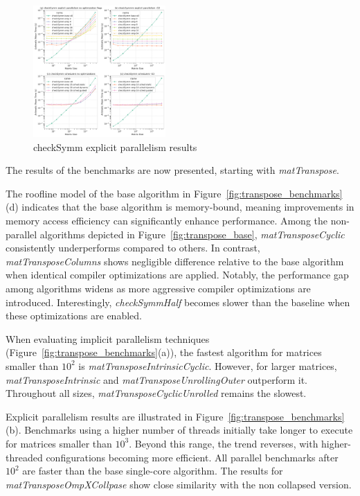 \documentclass[conference]{IEEEtran}
\begin{document}
\begin{figure}[htb]
	\centering
	\includegraphics[width=0.45\textwidth]{"../benchmarks/plotting/images/symm_all.pdf"}
	\caption{checkSymm explicit parallelism results}
	\label{fig:symm_benchmarks}
\end{figure}

The results of the benchmarks are now presented, starting with \textit{matTranspose}.


The roofline model of the base algorithm in Figure~\ref{fig:transpose_benchmarks}(d) indicates that the base algorithm is memory-bound, meaning improvements in memory access efficiency can significantly enhance performance. Among the non-parallel algorithms depicted in Figure~\ref{fig:transpose_base}, \textit{matTransposeCyclic} consistently underperforms compared to others. In contrast, \textit{matTransposeColumns} shows negligible difference relative to the base algorithm when identical compiler optimizations are applied. Notably, the performance gap among algorithms widens as more aggressive compiler optimizations are introduced. Interestingly, \textit{checkSymmHalf} becomes slower than the baseline when these optimizations are enabled.

When evaluating implicit parallelism techniques (Figure~\ref{fig:transpose_benchmarks}(a)), the fastest algorithm for matrices smaller than $10^2$ is \textit{matTransposeIntrinsicCyclic}. However, for larger matrices, \textit{matTransposeIntrinsic} and \textit{matTransposeUnrollingOuter} outperform it. Throughout all sizes, \textit{matTransposeCyclicUnrolled} remains the slowest.

Explicit parallelism results are illustrated in Figure~\ref{fig:transpose_benchmarks}(b). Benchmarks using a higher number of threads initially take longer to execute for matrices smaller than $10^3$. Beyond this range, the trend reverses, with higher-threaded configurations becoming more efficient. All parallel benchmarks after $10^2$ are faster than the base single-core algorithm. The results for \textit{matTransposeOmpXCollpase} show close similarity with the non collapsed version.
\end{document}
